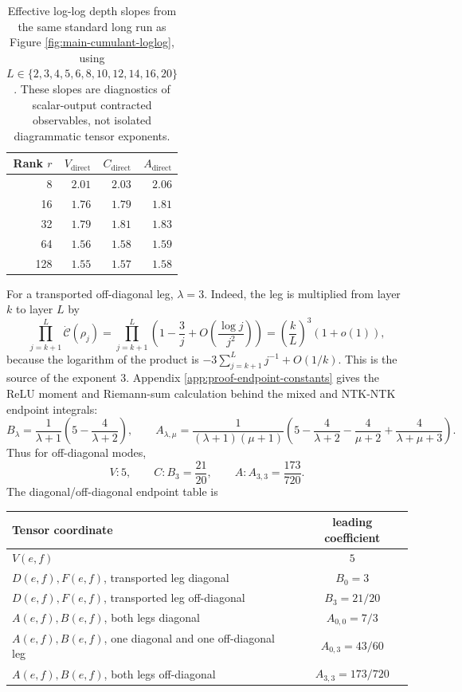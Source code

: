 \documentclass{article}
\begin{document}
\begin{table}[H]
\centering
\caption{Effective log-log depth slopes from the same standard long run as Figure \ref{fig:main-cumulant-loglog}, using \(L\in\{2,3,4,5,6,8,10,12,14,16,20\}\). These slopes are diagnostics of scalar-output contracted observables, not isolated diagrammatic tensor exponents.}
\label{tab:effective-cumulant-slopes}
\begin{tabular}{rrrr}
\toprule
Rank \(r\) & \(V_{\mathrm{direct}}\) & \(C_{\mathrm{direct}}\) & \(A_{\mathrm{direct}}\) \\
\midrule
8 & \(2.01\) & \(2.03\) & \(2.06\) \\
16 & \(1.76\) & \(1.79\) & \(1.81\) \\
32 & \(1.79\) & \(1.81\) & \(1.83\) \\
64 & \(1.56\) & \(1.58\) & \(1.59\) \\
128 & \(1.55\) & \(1.57\) & \(1.58\) \\
\bottomrule
\end{tabular}
\end{table}
For a transported off-diagonal leg, \(\lambda=3\). Indeed, the leg is multiplied from layer \(k\) to layer \(L\) by
\[
\prod_{j=k+1}^{L}\dot{\mathcal C}(\rho_j)
=\prod_{j=k+1}^{L}\left(1-\frac3j+O\left(\frac{\log j}{j^2}\right)\right)
=\left(\frac{k}{L}\right)^3(1+o(1)),
\]
because the logarithm of the product is \(-3\sum_{j=k+1}^{L}j^{-1}+O(1/k)\). This is the source of the exponent \(3\). Appendix \ref{app:proof-endpoint-constants} gives the ReLU moment and Riemann-sum calculation behind the mixed and NTK-NTK endpoint integrals:
\begin{equation}
B_\lambda=\frac1{\lambda+1}\left(5-\frac4{\lambda+2}\right),
\qquad
A_{\lambda,\mu}=\frac{1}{(\lambda+1)(\mu+1)}\left(5-\frac4{\lambda+2}-\frac4{\mu+2}+\frac4{\lambda+\mu+3}\right).
\end{equation}
Thus for off-diagonal modes,
\begin{equation}
V: 5,
\qquad
C: B_3=\frac{21}{20},
\qquad
A: A_{3,3}=\frac{173}{720}.
\label{eq:endpoint-constants}
\end{equation}
The diagonal/off-diagonal endpoint table is
\begin{center}
\begin{tabular}{lc}
\toprule
Tensor coordinate & leading coefficient \\
\midrule
\(V(e,f)\) & \(5\) \\
\(D(e,f),F(e,f)\), transported leg diagonal & \(B_0=3\) \\
\(D(e,f),F(e,f)\), transported leg off-diagonal & \(B_3=21/20\) \\
\(A(e,f),B(e,f)\), both legs diagonal & \(A_{0,0}=7/3\) \\
\(A(e,f),B(e,f)\), one diagonal and one off-diagonal leg & \(A_{0,3}=43/60\) \\
\(A(e,f),B(e,f)\), both legs off-diagonal & \(A_{3,3}=173/720\) \\
\bottomrule
\end{tabular}
\end{center}
\end{document}
